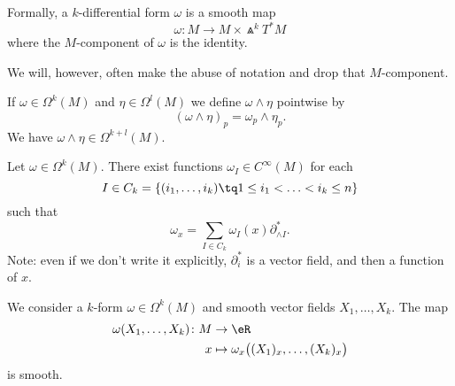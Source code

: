 \begin{normaltext}
	Formally, a \( k\)-differential form \( \omega\) is a smooth map
	\begin{equation}
		\omega \colon M\to M\times \Wedge^kT^*M
	\end{equation}
	where the \( M\)-component of \( \omega\) is the identity.

	We will, however, often make the abuse of notation and drop that \( M\)-component.
\end{normaltext}

\begin{propositionDef}		\label{PROPooQOUXooZfFHNb}
	If \( \omega\in \Omega^k(M)\) and \( \eta\in \Omega^l(M)\) we define \( \omega\wedge \eta\) pointwise by
	\begin{equation}
		(\omega\wedge \eta)_p=\omega_p\wedge \eta_p.
	\end{equation}
	We have \( \omega\wedge\eta\in\Omega^{k+l}(M)\).
\end{propositionDef}

\begin{proposition}		\label{PROPooNOGKooQedJba}
	Let \( \omega\in \Omega^k(M)\). There exist functions \( \omega_I\in C^{\infty}(M)\) for each
	\begin{equation}
		I\in C_k=\{ (i_1,\ldots,i_k)\tq 1\leq i_1<\ldots <i_k\leq n \}
	\end{equation}
	such that
	\begin{equation}
		\omega_x=\sum_{I\in C_k}\omega_I(x)\partial^*_{\wedge I}.
	\end{equation}
	Note: even if we don't write it explicitly, \( \partial^*_i\) is a vector field, and then a function of \( x\).
\end{proposition}

\noproof


\begin{proposition}			\label{PROPooHTKMooVzYQdW}
	We consider a \( k\)-form \( \omega\in \Omega^k(M)\) and smooth vector fields \( X_1,\ldots,X_k\). The map
	\begin{equation}
		\begin{aligned}
			\omega(X_1,\ldots,X_k)\colon M & \to \eR                                            \\
			x                              & \mapsto \omega_x\big( (X_1)_x,\ldots,(X_k)_x \big)
		\end{aligned}
	\end{equation}
	is smooth.
\end{proposition}


